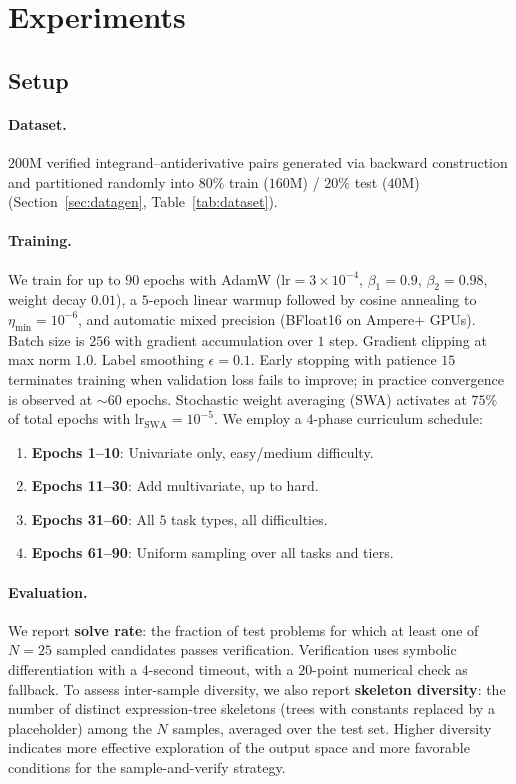 \documentclass{article}
\begin{document}
\section{Experiments}
\label{sec:experiments}

\subsection{Setup}

\paragraph{Dataset.} $200$M verified integrand--antiderivative pairs
generated via backward construction and partitioned randomly into
$80\%$ train ($160$M) / $20\%$ test ($40$M) (Section~\ref{sec:datagen},
Table~\ref{tab:dataset}).

\paragraph{Training.} We train for up to $90$ epochs with AdamW
($\text{lr}\!=\!3 \times 10^{-4}$, $\beta_1\!=\!0.9$, $\beta_2\!=\!0.98$,
weight decay $0.01$), a $5$-epoch linear warmup followed by cosine
annealing to $\eta_{\min}\!=\!10^{-6}$, and automatic mixed precision
(BFloat16 on Ampere+ GPUs). Batch size is $256$ with gradient accumulation
over $1$ step. Gradient clipping at max norm $1.0$. Label smoothing
$\epsilon\!=\!0.1$. Early stopping with patience $15$ terminates training
when validation loss fails to improve; in practice convergence is observed
at $\sim\!60$ epochs. Stochastic weight averaging (SWA) activates at $75\%$
of total epochs with $\text{lr}_{\text{SWA}}\!=\!10^{-5}$. We employ a
$4$-phase curriculum schedule:
\begin{enumerate}
	\item \textbf{Epochs 1--10}: Univariate only, easy/medium difficulty.
	\item \textbf{Epochs 11--30}: Add multivariate, up to hard.
	\item \textbf{Epochs 31--60}: All $5$ task types, all difficulties.
	\item \textbf{Epochs 61--90}: Uniform sampling over all tasks and tiers.
\end{enumerate}

\paragraph{Evaluation.} We report \textbf{solve rate}: the fraction of
test problems for which at least one of $N\!=\!25$ sampled candidates
passes verification. Verification uses symbolic differentiation with a
$4$-second timeout, with a $20$-point numerical check as fallback. To
assess inter-sample diversity, we also report \textbf{skeleton diversity}:
the number of distinct expression-tree skeletons (trees with constants
replaced by a placeholder) among the $N$ samples, averaged over the test
set. Higher diversity indicates more effective exploration of the output
space and more favorable conditions for the sample-and-verify strategy.
\end{document}
